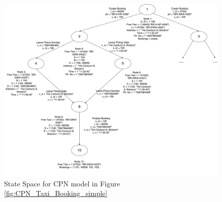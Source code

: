 \begin{figure}
	\includegraphics[scale = 0.21]{CPN_Taxi_Booking_State_Space.pdf}
	\caption{State Space for CPN model in Figure \ref{fig:CPN_Taxi_Booking_simple}}
	\label{fig:CPN_State_Space}
\end{figure}
